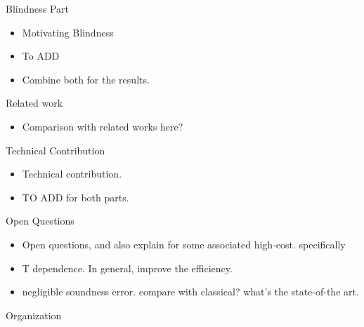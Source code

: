 Blindness Part 
\begin{itemize}
    \item Motivating Blindness
    \item To ADD
    \item Combine both for the results. 
\end{itemize}

Related work
\begin{itemize}
    \item Comparison with related works here?
\end{itemize}



Technical Contribution
\begin{itemize}
    \item Technical contribution. 
    \item TO ADD for both parts. 
\end{itemize}

Open Questions
\begin{itemize}
    \item Open questions, and also explain for some associated high-cost. specifically 
    \item T dependence. In general, improve the efficiency.  
    \item negligible soundness error.  compare with classical? what's the state-of-the art. 
\end{itemize}

Organization






